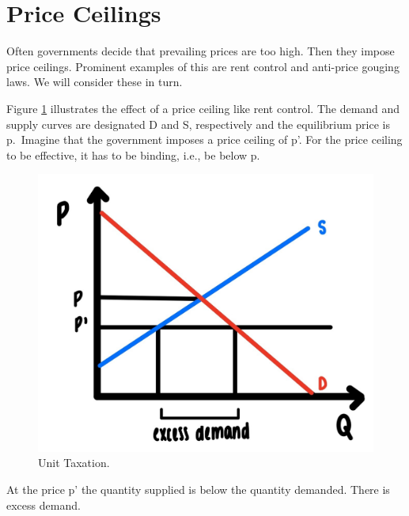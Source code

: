 \documentclass[
]{book}
\begin{document}
\hypertarget{price-ceilings}{%
\section{Price Ceilings}\label{price-ceilings}}

Often governments decide that prevailing prices are too high. Then they impose price ceilings. Prominent examples of this are rent control and anti-price gouging laws. We will consider these in turn.

Figure \ref{fig:compmarkets04} illustrates the effect of a price ceiling like rent control. The demand and supply curves are designated D and S, respectively and the equilibrium price is p.~Imagine that the government imposes a price ceiling of p'. For the price ceiling to be effective, it has to be binding, i.e., be below p.

\begin{figure}

{\centering \includegraphics[width=0.5\linewidth]{img/compmarkets/fig4} 

}

\caption{Unit Taxation.}\label{fig:compmarkets04}
\end{figure}

At the price p' the quantity supplied is below the quantity demanded. There is excess demand.
\end{document}
